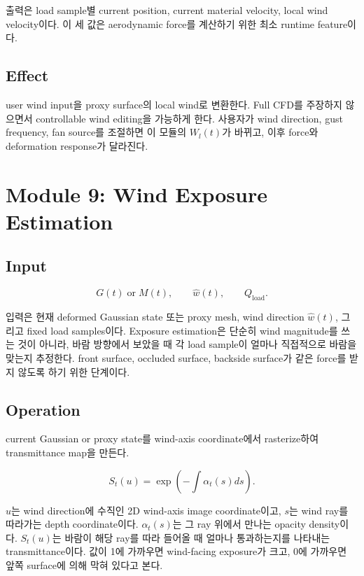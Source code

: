 \documentclass[11pt,a4paper]{article}
\begin{document}
출력은 load sample별 current position, current material velocity, local wind velocity이다.
이 세 값은 aerodynamic force를 계산하기 위한 최소 runtime feature이다.

\subsection*{Effect}

user wind input을 proxy surface의 local wind로 변환한다. Full CFD를 주장하지 않으면서 controllable wind editing을 가능하게 한다.
사용자가 wind direction, gust frequency, fan source를 조절하면 이 모듈의 $W_l(t)$가 바뀌고, 이후 force와 deformation response가 달라진다.

\section{Module 9: Wind Exposure Estimation}

\subsection*{Input}

\begin{equation}
G(t)\;\text{or}\;M(t),\qquad \hat{w}(t),\qquad Q_{\mathrm{load}}.
\end{equation}

입력은 현재 deformed Gaussian state 또는 proxy mesh, wind direction $\hat{w}(t)$, 그리고 fixed load samples이다.
Exposure estimation은 단순히 wind magnitude를 쓰는 것이 아니라, 바람 방향에서 보았을 때 각 load sample이 얼마나 직접적으로 바람을 맞는지 추정한다.
front surface, occluded surface, backside surface가 같은 force를 받지 않도록 하기 위한 단계이다.

\subsection*{Operation}

current Gaussian or proxy state를 wind-axis coordinate에서 rasterize하여 transmittance map을 만든다.

\begin{equation}
S_t(u)=\exp\left(-\int\alpha_t(s)ds\right).
\end{equation}

$u$는 wind direction에 수직인 2D wind-axis image coordinate이고, $s$는 wind ray를 따라가는 depth coordinate이다.
$\alpha_t(s)$는 그 ray 위에서 만나는 opacity density이다.
$S_t(u)$는 바람이 해당 ray를 따라 들어올 때 얼마나 통과하는지를 나타내는 transmittance이다.
값이 1에 가까우면 wind-facing exposure가 크고, 0에 가까우면 앞쪽 surface에 의해 막혀 있다고 본다.
\end{document}
